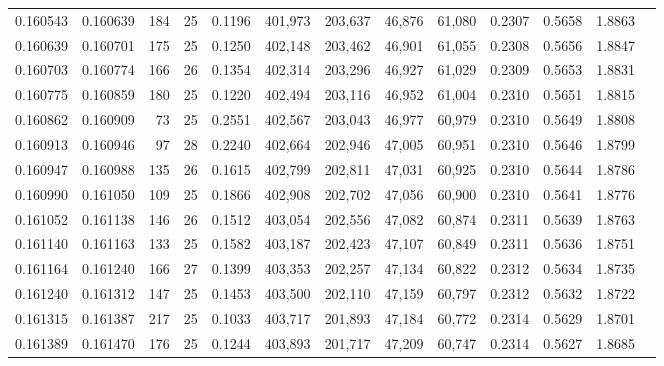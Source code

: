 \begin{tabular}{rrrrrrrrrrrrr}
0.160543 & 0.160639 & 184 &  25 &                                     0.1196 & 401,973 & 203,637 &  46,876 &  61,080 & 0.2307 & 0.5658 & 1.8863 \\
0.160639 & 0.160701 & 175 &  25 &                                     0.1250 & 402,148 & 203,462 &  46,901 &  61,055 & 0.2308 & 0.5656 & 1.8847 \\
0.160703 & 0.160774 & 166 &  26 &                                     0.1354 & 402,314 & 203,296 &  46,927 &  61,029 & 0.2309 & 0.5653 & 1.8831 \\
0.160775 & 0.160859 & 180 &  25 &                                     0.1220 & 402,494 & 203,116 &  46,952 &  61,004 & 0.2310 & 0.5651 & 1.8815 \\
0.160862 & 0.160909 &  73 &  25 &                                     0.2551 & 402,567 & 203,043 &  46,977 &  60,979 & 0.2310 & 0.5649 & 1.8808 \\
0.160913 & 0.160946 &  97 &  28 &                                     0.2240 & 402,664 & 202,946 &  47,005 &  60,951 & 0.2310 & 0.5646 & 1.8799 \\
0.160947 & 0.160988 & 135 &  26 &                                     0.1615 & 402,799 & 202,811 &  47,031 &  60,925 & 0.2310 & 0.5644 & 1.8786 \\
0.160990 & 0.161050 & 109 &  25 &                                     0.1866 & 402,908 & 202,702 &  47,056 &  60,900 & 0.2310 & 0.5641 & 1.8776 \\
0.161052 & 0.161138 & 146 &  26 &                                     0.1512 & 403,054 & 202,556 &  47,082 &  60,874 & 0.2311 & 0.5639 & 1.8763 \\
0.161140 & 0.161163 & 133 &  25 &                                     0.1582 & 403,187 & 202,423 &  47,107 &  60,849 & 0.2311 & 0.5636 & 1.8751 \\
0.161164 & 0.161240 & 166 &  27 &                                     0.1399 & 403,353 & 202,257 &  47,134 &  60,822 & 0.2312 & 0.5634 & 1.8735 \\
0.161240 & 0.161312 & 147 &  25 &                                     0.1453 & 403,500 & 202,110 &  47,159 &  60,797 & 0.2312 & 0.5632 & 1.8722 \\
0.161315 & 0.161387 & 217 &  25 &                                     0.1033 & 403,717 & 201,893 &  47,184 &  60,772 & 0.2314 & 0.5629 & 1.8701 \\
0.161389 & 0.161470 & 176 &  25 &                                     0.1244 & 403,893 & 201,717 &  47,209 &  60,747 & 0.2314 & 0.5627 & 1.8685 \\

\end{tabular}
